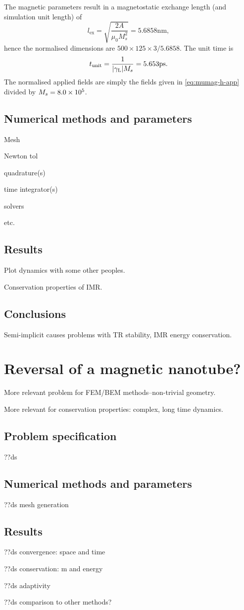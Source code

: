 The magnetic parameters result in a magnetostatic exchange length (and simulation unit length) of
\begin{equation}
  l_{\text{ex}} = \sqrt{\frac{2A}{\mu_0 M_s^2}} = 5.6858\text{nm},
\end{equation}
hence the normalised dimensions are $500 \times 125 \times 3 / 5.6858$.
The unit time is
\begin{equation}
  t_{\text{unit}} = \frac{1}{{\left|{\gamma_{\mathrm{\tiny{L}}}} \right|} M_s} = 5.653\text{ps}.
\end{equation}
The normalised applied fields are simply the fields given in \cref{eq:mumag-h-app} divided by $M_s = 8.0\times 10^{5}$.

\subsection{Numerical methods and parameters}

Mesh

Newton tol

quadrature(s)

time integrator(s)

solvers

etc.


\subsection{Results}

Plot dynamics with some other peoples.

Conservation properties of IMR.


\subsection{Conclusions}

Semi-implicit causes problems with TR stability, IMR energy conservation.


\section{Reversal of a magnetic nanotube?}

More relevant problem for FEM/BEM methods--non-trivial geometry.

More relevant for conservation properties: complex, long time dynamics.


\subsection{Problem specification}

??ds


\subsection{Numerical methods and parameters}

??ds mesh generation



\subsection{Results}

??ds convergence: space and time


??ds conservation: m and energy


??ds adaptivity


??ds comparison to other methods?


